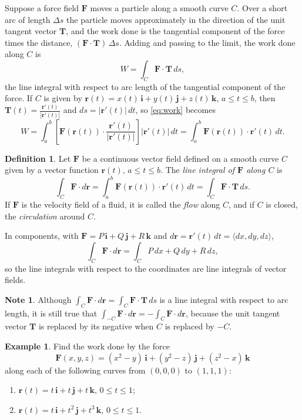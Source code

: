 \documentclass[11pt,a4paper]{article}
\theoremstyle{definition}
\newtheorem{defn}[thm]{Definition}
\newtheorem{exa}[thm]{Example}
\newtheorem*{note}{Note}
\begin{document}
Suppose a force field $\mathbf F$ moves a particle along a smooth curve $C$. Over
a short arc of length $\Delta s$ the particle moves approximately in the
direction of the unit tangent vector $\mathbf T$, and the work done is the
tangential component of the force times the distance, $(\mathbf F\cdot\mathbf
T)\,\Delta s$. Adding and passing to the limit, the work done along $C$ is
\begin{equation}
W = \int_C \mathbf F\cdot \mathbf T\,ds ,
\label{eq:work}
\end{equation}
the line integral with respect to arc length of the tangential component of the
force. If $C$ is given by $\mathbf r(t) = x(t)\,\mathbf i + y(t)\,\mathbf j +
z(t)\,\mathbf k$, $a\leq t\leq b$, then $\mathbf T(t) = \frac{\mathbf
r'(t)}{|\mathbf r'(t)|}$ and $ds = |\mathbf r'(t)|\,dt$, so \eqref{eq:work}
becomes
\[W = \int^b_a \left[\mathbf F(\mathbf r(t)) \cdot \frac{\mathbf r'(t)}{|\mathbf
r'(t)|}\right]|\mathbf r'(t)|\,dt = \int^b_a\mathbf F(\mathbf r(t))\cdot \mathbf
r'(t)\,dt .\]

\begin{defn}
\label{defn:lineintvector}
Let $\mathbf F$ be a continuous vector field defined on a smooth curve $C$ given
by a vector function $\mathbf r(t)$, $a\leq t \leq b$. The \emph{line integral
of $\mathbf F$ along $C$} is
\[\int_C \mathbf F\cdot d\mathbf r = \int^b_a \mathbf F(\mathbf r(t))\cdot
\mathbf r'(t)\, dt = \int_C \mathbf F\cdot \mathbf T\,ds .\]
If $\mathbf F$ is the velocity field of a fluid, it is called the \emph{flow}
along $C$, and if $C$ is closed, the \emph{circulation} around $C$.
\end{defn}

In components, with $\mathbf F = P\,\mathbf i + Q\,\mathbf j + R\,\mathbf k$ and
$d\mathbf r = \mathbf r'(t)\,dt = \langle dx, dy, dz\rangle$,
\[\int_C \mathbf F\cdot d\mathbf r = \int_C P\,dx + Q\,dy + R\,dz ,\]
so the line integrals with respect to the coordinates are line integrals of
vector fields.

\begin{note}
Although $\int_C \mathbf F\cdot d\mathbf r = \int_C \mathbf F\cdot \mathbf T\,
ds$ is a line integral with respect to arc length, it is still true that
$\int_{-C}\mathbf F\cdot d\mathbf r = -\int_C \mathbf F\cdot d\mathbf r$, because
the unit tangent vector $\mathbf T$ is replaced by its negative when $C$ is
replaced by $-C$.
\end{note}

\begin{exa}
\label{ex:work}
Find the work done by the force
\[\mathbf F(x,y,z) = (x^2 -y)\,\mathbf i + (y^2 - z)\,\mathbf j + (z^2-x)\,\mathbf
k\]
along each of the following curves from $(0,0,0)$ to $(1,1,1)$:
\begin{enumerate}
\item $\mathbf r(t) = t\,\mathbf i + t \,\mathbf j + t\,\mathbf k$, $0\leq t\leq
1$;

\item $\mathbf r(t) = t\,\mathbf i + t^2\,\mathbf j + t^3\,\mathbf k$, $0\leq t
\leq 1$.
\end{enumerate}
\end{exa}
\end{document}
